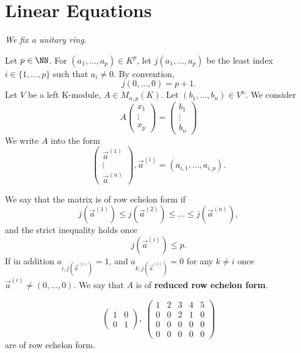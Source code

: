 \section{Linear Equations}
{\large\textit{We fix a unitary ring.}}
\begin{definitionenv}
    Let $p\in \NN$. For $(a_1,\dots,a_p)\in K^p$, let $j(a_1,\dots,a_p)$ be the least index $i\in\{1,\dots,p\}$ such that $a_i\not=0$. By convention,
    $$j(0,\dots,0)=p+1.$$
    Let $V$ be a left K-module, $A\in M_{n,p}(K)$. Let $(b_1,\dots , b_n)\in V^n$. We consider
\begin{equation*}
A\begin{pmatrix}
 x_1\\
 \vdots\\
x_p
\end{pmatrix}=\begin{pmatrix}
 b_1\\
 \vdots\\
b_n
\end{pmatrix}\tag{$*$}
\end{equation*}
We write $A$ into the form
$$\begin{pmatrix}
 \vec{a}^{(1)} \\
 \vdots\\
 \vec{a}^{(n)}
\end{pmatrix}, \vec{a}^{(i)}=(a_{i,1},\dots,a_{i,p}).$$
\end{definitionenv}
\begin{definitionenv}
    We say that the matrix is of row echelon form if 
    $$j\left(\vec{a}^{(1)}\right)\le j\left(\vec{a}^{(2)}\right)\le \dots\le j\left(\vec{a}^{(n)}\right),$$
    and the strict inequality holds once $$j\left(\vec{a}^{(i)}\right)\le p.$$
    If in addition $a_{i,j\left(\vec{a}^{(i)}\right)}=1$,  and $a_{k,j\left(\vec{a}^{(i)}\right)}=0$ for any $k\not=i$ once $\vec{a}^{(i)}\not=(0,\dots,0)$. We say that $A$ is of \textbf{reduced row echelon form}. 
\end{definitionenv}
\begin{exampleenv}
    $$
    \begin{pmatrix}
        1&0\\
        0&1
    \end{pmatrix},\ 
\begin{pmatrix}
  1&2  &3  &4  &5 \\
  0& 0 &2  &1  &0 \\
  0& 0 &0  & 0 &0 \\
  0& 0 &  0&  0&0
\end{pmatrix}$$ are of row echelon form.
\end{exampleenv}
